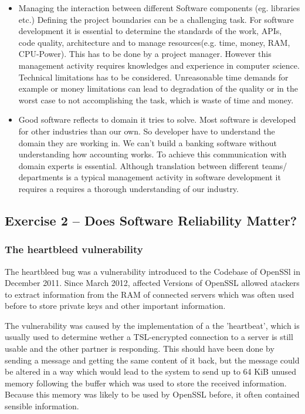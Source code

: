 \documentclass{scrartcl}
\begin{document}
\begin{itemize}
\item Managing the interaction between different Software components (eg. libraries etc.)
Defining the project boundaries can be a challenging task. 
For software development it is essential to determine the standards of the work,
APIs, code quality, architecture and to manage resources(e.g. time, money, RAM, CPU-Power). 
This has to be done by a project manager. However this management activity requires knowledges 
and experience in computer science. Technical limitations has to be considered. 
Unreasonable time demands for example or money limitations can lead to degradation of the quality 
or in the worst case to not accomplishing the task, which is waste of time and money.

\item Good software reflects to domain it tries to solve.
Most software is developed for other industries than our own. So developer have to understand the domain they are working in. We can't build a banking software without understanding how accounting works.
To achieve this communication with domain experts is essential. 
Although translation between different teams/ departments is a typical management activity in software development it requires a requires a thorough understanding of our industry.
\end{itemize}

\subsection*{Exercise 2 – Does Software Reliability Matter?}

\subsubsection*{The heartbleed vulnerability}

The heartbleed bug was a vulnerability introduced to the Codebase of OpenSSl in December 2011. Since March 2012, affected Versions of OpenSSL allowed atackers to extract information from the RAM of connected servers which was often used before to store private keys and other important information.

The vulnerability was caused by the implementation of a the 'heartbeat', which is usually used to determine wether a TSL-encrypted connection to a server is still usable and the other partner is responding. This should have been done by sending a message and getting the same content of it back, but the message could be altered in a way which would lead to the system to send up to 64 KiB unused memory following the buffer which was used to store the received information. Because this memory was likely to be used by OpenSSL before, it often contained sensible information.\\
\end{document}
